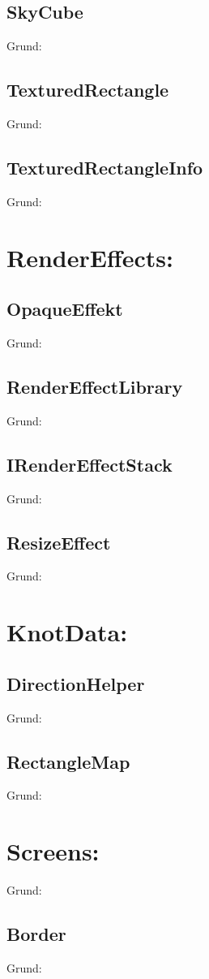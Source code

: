 \subsection{SkyCube}
Grund:
\subsection{TexturedRectangle}
Grund:
\subsection{TexturedRectangleInfo}
Grund:

\section{RenderEffects:}
\subsection{OpaqueEffekt}
Grund:
\subsection{RenderEffectLibrary}
Grund:
\subsection{IRenderEffectStack}
Grund:
\subsection{ResizeEffect}
Grund:

\section{KnotData:}
\subsection{DirectionHelper}
Grund:
\subsection{RectangleMap}
Grund:

\section{Screens:}
Grund:
\subsection{Border}
Grund:
